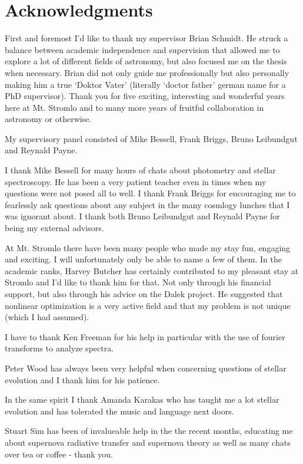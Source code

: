 \section*{Acknowledgments}

First and foremost I'd like to thank my supervisor Brian Schmidt. He struck a balance between academic independence and supervision that allowed me to explore a lot of different fields of astronomy, but also focused me on the thesis when necessary. Brian did not only guide me professionally but also personally making him a true `Doktor Vater' (literally `doctor father' german name for a PhD supervisor). Thank you for five exciting, interesting and wonderful years here at Mt. Stromlo and to many more years of fruitful collaboration in astronomy or otherwise.

My supervisory panel consisted of Mike Bessell, Frank Briggs, Bruno Leibundgut and Reynald Payne.

I  thank Mike Bessell for many hours of chats about photometry and stellar spectroscopy. He has been a very patient teacher even in times when my questions were not posed all to well.  
I thank Frank Briggs for encouraging me to fearlessly ask questions about any subject in the many cosmlogy lunches that I was ignorant about. 
I thank both Bruno Leibundgut and Reynald Payne for being my external advisors. 

At Mt. Stromlo there have been many people who made my stay fun, engaging and exciting. I will unfortunately only be able to name a few of them.
In the academic ranks, Harvey Butcher has certainly contributed to my pleasant stay at Stromlo and I'd like to thank him for that. Not only through his financial support, but also through his advice on the Dalek project. He suggested that nonlinear optimization is a very active field and that my problem is not unique (which I had assumed). 

I have to thank Ken Freeman for his help in particular with the use of fourier transforms to analyze spectra. 

Peter Wood has always been very helpful when concerning questions of stellar evolution and I thank him for his patience.

In the same spirit I thank Amanda Karakas who has taught me a lot stellar evolution and has tolerated the music and language next doors.

Stuart Sim has been of invalueable help in the the recent months, educating me about supernova radiative transfer and supernova theory as well as many chats over tea or coffee - thank you.

